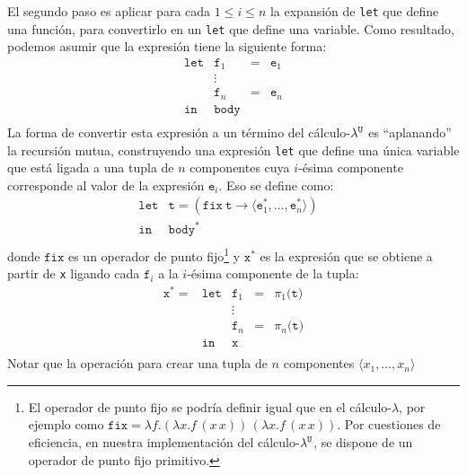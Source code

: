 \begin{enumerate}
    El segundo paso es aplicar para cada $1 \leq i \leq n$
    la expansión de \texttt{let} que define una función,
    para convertirlo en un \texttt{let} que define una variable.
    Como resultado, podemos asumir que la expresión tiene la siguiente
    forma:
    \[
    \begin{array}{rlll}
        \texttt{let} & \texttt{f$_1$} & = & \texttt{e$_1$} \\
        & \vdots & \\
                     & \texttt{f$_n$} & = & \texttt{e$_n$} \\
         \texttt{in} & \texttt{body}  &\\
    \end{array}
    \]
    La forma de convertir esta expresión a un término del cálculo-$\lambda^{\mathtt{U}}$
    es ``aplanando'' la recursión mutua, construyendo una expresión \texttt{let}
    que define una única variable que está ligada a una tupla de $n$ componentes
    cuya $i$-ésima componente corresponde al valor de la expresión $\texttt{e}_i$.
    Eso se define como:
    $$
    \begin{array}{rll}
       \texttt{let}  & \texttt{t} = (\texttt{fix}\ \texttt{t} \to \langle \texttt{e}_1^*, \hdots, \texttt{e}_n^* \rangle)\\
         \texttt{in} & \texttt{body}^* &\\
    \end{array}
    $$
    donde $\texttt{fix}$ es un operador de punto fijo\footnote{El
    operador de punto fijo se podría definir igual que en el cálculo-$\lambda$,
    por ejemplo como $\texttt{fix} = \lambda{f}.(\lambda{x}.f\,(x\,x))\,(\lambda{x}.f\,(x\,x))$.
    Por cuestiones de eficiencia, en nuestra implementación
    del cálculo-$\lambda^{\mathtt{U}}$, se dispone de un operador de punto fijo primitivo.}
    y $\texttt{x}^*$ es la expresión que se obtiene a partir de \texttt{x}
    ligando cada $\texttt{f}_i$ a la $i$-ésima componente de la tupla:
    \[
    \begin{array}{lrlll}
       \texttt{x}^* = 
       &  \texttt{let} & \texttt{f$_1$} & = & \texttt{$\pi_1$(t)} \\
       &  & \vdots & \\
       &               & \texttt{f$_n$} & = & \texttt{$\pi_n$(t)} \\
       &   \texttt{in} & \texttt{x}  &\\
    \end{array}
    \]
    Notar que la operación para crear una tupla de $n$ componentes $\langle x_1, \hdots, x_n \rangle$

\end{enumerate}

